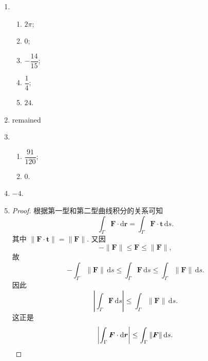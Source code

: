 % 
\begin{enumerate}
    \item %
        \begin{enumerate}[(1)]
            \item %
                $2\pi$;
            \item %
                $0$;
            \item %
                $-\dfrac{14}{15}$;
            \item %
                $\dfrac{1}{4}$;
            \item %
                $24$.
        \end{enumerate}
    \item %
        {\color{red}remained}
    \item %
        \begin{enumerate}[(1)]
            \item %
                $\dfrac{91}{120}$;
            \item %
                $0$.
        \end{enumerate}
    \item %
        $-4$.
    \item %
        \begin{proof}
            根据第一型和第二型曲线积分的关系可知
            \[
                \int_{\Gamma}\boldsymbol{F} \cdot \mathrm{d}\boldsymbol{r} = \int_{\Gamma} \boldsymbol{F}\cdot \boldsymbol{t}\,\mathrm{d}s.    
            \]
            其中 $\|\boldsymbol{F}\cdot\boldsymbol{t}\| = \|\boldsymbol{F}\|$. 又因
            \[
                -\|\boldsymbol{F}\| \leq \boldsymbol{F} \leq \|\boldsymbol{F}\|,    
            \]
            故
            \[
                -\int_{\Gamma}\|\boldsymbol{F}\|\,\mathrm{d}s \leq \int_{\Gamma}\boldsymbol{F}\,\mathrm{d}s \leq \int_{\Gamma}\|\boldsymbol{F}\|\,\mathrm{d}s.  
            \]
            因此
            \[
                \left|\int_{\Gamma}\boldsymbol{F}\,\mathrm{d}s\right| \leq \int_{\Gamma}\|\boldsymbol{F}\|\,\mathrm{d}s.   
            \]
            这正是
            \[
                \left|\int_{\Gamma}\boldsymbol{F} \cdot \mathrm{d}\boldsymbol{r}\right| \leq \int_{\Gamma}\|\boldsymbol{F}\|\,\mathrm{d}s. \qedhere
            \]
        \end{proof}
\end{enumerate}
% 
